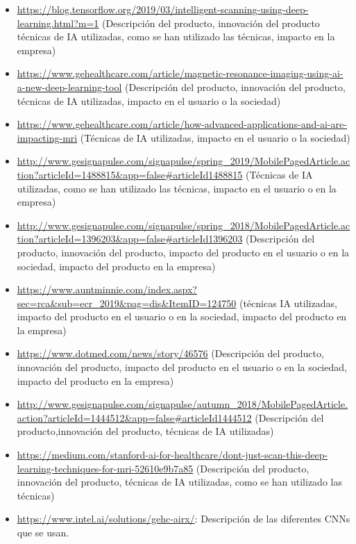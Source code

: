 \begin{itemize}

\item \url{https://blog.tensorflow.org/2019/03/intelligent-scanning-using-deep-learning.html?m=1}   (Descripción del producto, innovación del producto técnicas de IA utilizadas, como se han utilizado las técnicas, impacto en la empresa)
\item \url{https://www.gehealthcare.com/article/magnetic-resonance-imaging-using-ai-a-new-deep-learning-tool}   (Descripción del producto, innovación del producto, técnicas de IA utilizadas, impacto en el usuario o la sociedad)
\item \url{https://www.gehealthcare.com/article/how-advanced-applications-and-ai-are-impacting-mri}  (Técnicas de IA utilizadas, impacto en el usuario o la sociedad)
\item \url{http://www.gesignapulse.com/signapulse/spring_2019/MobilePagedArticle.action?articleId=1488815&app=false#articleId1488815} (Técnicas de IA utilizadas, como se han utilizado las técnicas, impacto en el usuario o en la empresa)
\item \url{http://www.gesignapulse.com/signapulse/spring_2018/MobilePagedArticle.action?articleId=1396203&app=false#articleId1396203} (Descripción del producto, innovación del producto, impacto del producto en el usuario o en la sociedad, impacto del producto en la empresa)
\item \url{https://www.auntminnie.com/index.aspx?sec=rca&sub=ecr_2019&pag=dis&ItemID=124750}  (técnicas IA utilizadas, impacto del producto en el usuario o en la sociedad, impacto del producto en la empresa)
\item \url{https://www.dotmed.com/news/story/46576}    (Descripción del producto, innovación del producto, impacto del producto en el usuario o en la sociedad, impacto del producto en la empresa)
\item \url{http://www.gesignapulse.com/signapulse/autumn_2018/MobilePagedArticle.action?articleId=1444512&app=false#articleId1444512}  (Descripción del producto,innovación del producto,  técnicas de IA utilizadas)
\item \url{https://medium.com/stanford-ai-for-healthcare/dont-just-scan-this-deep-learning-techniques-for-mri-52610e9b7a85}   (Descripción del producto, innovación del producto,  técnicas de IA utilizadas, como se han utilizado las técnicas)
\item \url{https://www.intel.ai/solutions/gehc-airx/}: Descripción de las diferentes CNNs que se usan.

\end{itemize}

